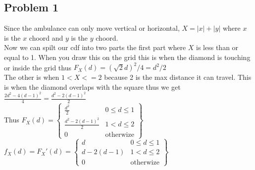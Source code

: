 \documentclass[12pt, letterpaper]{article}
\theoremstyle{definition}
\renewcommand{\t}[1]{\text{#1}}
\begin{document}
\pagestyle{fancy}
\fancyhf{}
\fancyhead[ROE]{\thepage}

\subsection*{Problem 1}
Since the ambulance can only move vertical or horizontal, $X=|x|+|y|$ where $x$ is the $x$ choord and $y$ is the $y$ choord.\\
Now we can spilt our cdf into two parts the first part where $X$ is less than or equal to 1. When you draw this on the grid this is when the diamond is touching or inside the grid thus $F_{X}(d)=(\sqrt{2}d)^2/4=d^2/2$\\
The other is when $1 < X <= 2$ because 2 is the max distance it can travel. This is when the diamond overlaps with the square thus we get $\frac{2d^2-4(d-1)^2}{4}=\frac{d^2-2(d-1)^2}{2}$\\
Thus $F_{X}(d)=\left\{ \begin{array}{lr}
    \frac{d^2}{2} & 0 \leq d \leq 1\\
    \frac{d^2-2(d-1)^2}{2} & 1 < d \leq 2\\
    0 & \t{otherwize}
\end{array} \right\}$\\
$f_{X}(d)=F_{X}'(d)=\left\{ \begin{array}{lr}
    d & 0 \leq d \leq 1\\
    d-2(d-1) & 1 < d \leq 2\\
    0 & \t{otherwize}
\end{array} \right\}$

\newpage
\end{document}
